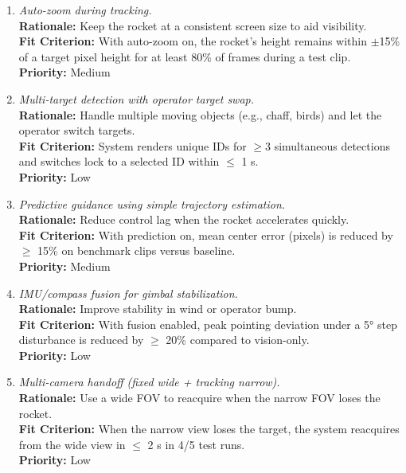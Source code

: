 \documentclass[12pt]{article}
\begin{document}
\begin{enumerate}[label=WTRM \arabic*., wide=0pt, leftmargin=*]

  \item \emph{Auto-zoom during tracking.}\\[2mm]
  \textbf{Rationale:} Keep the rocket at a consistent screen size to aid visibility.\\
  \textbf{Fit Criterion:} With auto-zoom on, the rocket’s height remains within $\pm$15\% of a target pixel height for at least 80\% of frames during a test clip.\\
  \textbf{Priority:} Medium

  \item \emph{Multi-target detection with operator target swap.}\\[2mm]
  \textbf{Rationale:} Handle multiple moving objects (e.g., chaff, birds) and let the operator switch targets.\\
  \textbf{Fit Criterion:} System renders unique IDs for $\geq$3 simultaneous detections and switches lock to a selected ID within $\leq$ 1 s.\\
  \textbf{Priority:} Low

  \item \emph{Predictive guidance using simple trajectory estimation.}\\[2mm]
  \textbf{Rationale:} Reduce control lag when the rocket accelerates quickly.\\
  \textbf{Fit Criterion:} With prediction on, mean center error (pixels) is reduced by $\geq$ 15\% on benchmark clips versus baseline.\\
  \textbf{Priority:} Medium

  \item \emph{IMU/compass fusion for gimbal stabilization.}\\[2mm]
  \textbf{Rationale:} Improve stability in wind or operator bump.\\
  \textbf{Fit Criterion:} With fusion enabled, peak pointing deviation under a 5° step disturbance is reduced by $\geq$ 20\% compared to vision-only.\\
  \textbf{Priority:} Low

  \item \emph{Multi-camera handoff (fixed wide + tracking narrow).}\\[2mm]
  \textbf{Rationale:} Use a wide FOV to reacquire when the narrow FOV loses the rocket.\\
  \textbf{Fit Criterion:} When the narrow view loses the target, the system reacquires from the wide view in $\leq$ 2 s in 4/5 test runs.\\
  \textbf{Priority:} Low


\end{enumerate}
\end{document}
